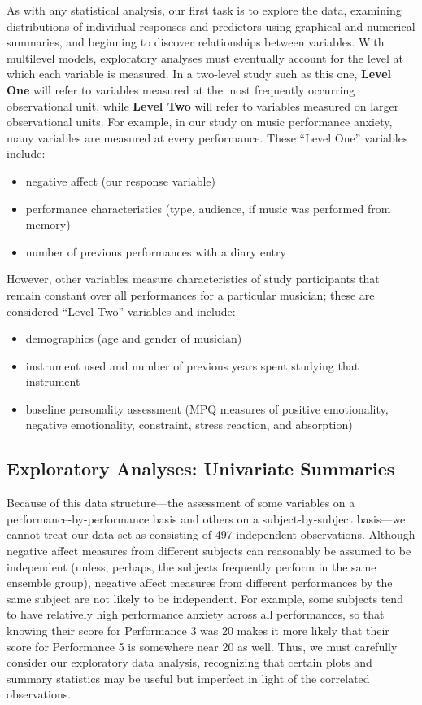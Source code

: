 \documentclass[
]{krantz}
\providecommand{\tightlist}{%
  \setlength{\itemsep}{0pt}\setlength{\parskip}{0pt}}
\begin{document}
As with any statistical analysis, our first task is to explore the data, examining distributions of individual responses and predictors using graphical and numerical summaries, and beginning to discover relationships between variables. With multilevel models, exploratory analyses must eventually account for the level at which each variable is measured. In a two-level study such as this one, \textbf{Level One}  will refer to variables measured at the most frequently occurring observational unit, while \textbf{Level Two} will refer to variables measured on larger observational units. For example, in our study on music performance anxiety, many variables are measured at every performance. These ``Level One'' variables include:

\begin{itemize}
\tightlist
\item
  negative affect (our response variable)
\item
  performance characteristics (type, audience, if music was performed from memory)
\item
  number of previous performances with a diary entry
\end{itemize}

However, other variables measure characteristics of study participants that remain constant over all performances for a particular musician; these are considered ``Level Two'' variables and include:

\begin{itemize}
\tightlist
\item
  demographics (age and gender of musician)
\item
  instrument used and number of previous years spent studying that instrument
\item
  baseline personality assessment (MPQ measures of positive emotionality, negative emotionality, constraint, stress reaction, and absorption)
\end{itemize}

\subsection{Exploratory Analyses: Univariate Summaries}\label{explore1}

Because of this data structure---the assessment of some variables on a performance-by-performance basis and others on a subject-by-subject basis---we cannot treat our data set as consisting of 497 independent observations. Although negative affect measures from different subjects can reasonably be assumed to be independent (unless, perhaps, the subjects frequently perform in the same ensemble group), negative affect measures from different performances by the same subject are not likely to be independent. For example, some subjects tend to have relatively high performance anxiety across all performances, so that knowing their score for Performance 3 was 20 makes it more likely that their score for Performance 5 is somewhere near 20 as well. Thus, we must carefully consider our exploratory data analysis, recognizing that certain plots and summary statistics may be useful but imperfect in light of the correlated observations.
\end{document}
